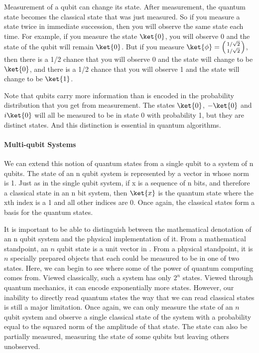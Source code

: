 Measurement of a qubit can change its state.
After measurement, the quantum state becomes the classical state that was just measured.
So if you measure a state twice in immediate succession, then you will observe the same state each time.
For example, if you measure the state $\ket{0}$, you will observe 0 and the state of the qubit will remain $\ket{0}$.
But if you measure $\ket{\phi} = \icol{1/\sqrt{2} \\ 1/\sqrt{2}}$, then there is a 1/2 chance that you will observe 0 and the state will change to be $\ket{0}$, and there is a 1/2 chance that you will observe 1 and the state will change to be $\ket{1}$.

Note that qubits carry more information than is encoded in the probability distribution that you get from measurement.
The states $\ket{0}$, $-\ket{0}$ and $i\ket{0}$ will all be measured to be in state 0 with probability 1, but they are distinct states.
And this distinction is essential in quantum algorithms.

\paragraph{Multi-qubit Systems}
We can extend this notion of quantum states from a single qubit to a system of n qubits.
The state of an n qubit system is represented by a vector in  whose norm is 1.
Just as in the single qubit system, if x is a sequence of n bits, and therefore a classical state in an n bit system, then $\ket{x}$ is the quantum state where the xth index is a 1 and all other indices are 0. Once again, the classical states form a basis for the quantum states.


It is important to be able to distinguish between the mathematical denotation of an n qubit system and the physical implementation of it.
From a mathematical standpoint, an $n$ qubit state is a unit vector in .
From a physical standpoint, it is $n$ specially prepared objects that each could be measured to be in one of two states.
Here, we can begin to see where some of the power of quantum computing comes from.
Viewed classically, such a system has only $2^n$ states.
Viewed through quantum mechanics, it can encode exponentially more states.
However, our inability to directly read quantum states the way that we can read classical states is still a major limitation.
Once again, we can only measure the state of an $n$ qubit system and observe a single classical state of the system with a probability equal to the squared norm of the amplitude of that state. The state can also be partially measured, measuring the state of some qubits but leaving others unobserved.
